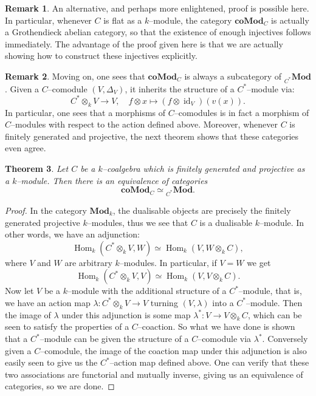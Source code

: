 \documentclass{article}
\theoremstyle{plain}
\newtheorem{Th}{Theorem}[section]
\theoremstyle{definition}
\newtheorem{Rem}[Th]{Remark}
\DeclareMathOperator{\id}{id}
\DeclareMathOperator{\Hom}{Hom}
\begin{document}
\begin{Rem}
    An alternative, and perhaps more enlightened, proof is possible here. In particular, whenever $C$ is flat as a $k$--module, the category $\textbf{coMod}_C$ is actually a Grothendieck abelian category, so that the existence of enough injectives follows immediately. The advantage of the proof given here is that we are actually showing how to construct these injectives explicitly.
\end{Rem}


\begin{Rem}\label{comodC embedding into modC*}
    Moving on, one sees that $\textbf{coMod}_C$ is always a subcategory of ${}_{C^*}\textbf{Mod}$. Given a $C$--comodule $(V, \Delta_V)$, it inherits the structure of a $C^*$--module via:
\[
C^* \otimes_k V \to V, \quad f\otimes x \mapsto (f \otimes \id_V)(v(x)).
\]
 In particular, one sees that a morphisms of 
$C$--comodules is in fact a morphism of $C$--modules with respect to the action defined above. 
Moreover, whenever $C$ is finitely generated and projective, the next theorem shows that these categories even agree.
\end{Rem}


\begin{Th}\label{equivalence}
    Let $C$ be a $k$--coalgebra which is finitely generated and projective as a $k$--module. Then there is an equivalence of categories 
    \[
    \mathbf{coMod}_C \simeq {}_{C^*}\mathbf{Mod}.
    \]
\end{Th}

\begin{proof}
    In the category $\textbf{Mod}_k$, the dualisable objects are precisely the finitely generated projective $k$--modules, thus we see that $C$ is a dualisable $k$--module. In other words, we have an adjunction:
    \[
    \Hom_k(C^*\otimes_k V, W) \simeq \Hom_k(V, W\otimes_k C ),
    \]
     where $V$ and $W$ are arbitrary $k$--modules. In particular, if $V=W$ we get
    \[
    \Hom_k(C^* \otimes_k V, V) \simeq \Hom_k(V, V\otimes_k C ).
    \]
     Now let $V$ be a $k$--module with the additional structure of a $C^*$--module, that is, we have an action map $\lambda\colon C^*\otimes_k V \to V$ turning $(V,\lambda)$ into a $C^\ast$--module. Then the image of $\lambda$ under this adjunction is some map $\lambda^\ast\colon  V\to V\otimes_k C$, which can be seen to satisfy the properties of a $C$--coaction. So what we have done is shown that a $C^*$--module can be given the structure of a $C$--comodule via $\lambda^\ast$. Conversely given a $C$--comodule, the image of the coaction map under this adjunction is also easily seen to give us the $C^*$--action map defined above. One can verify that these two associations are functorial and mutually inverse, giving us an equivalence of categories, so we are done.
\end{proof}
\end{document}
